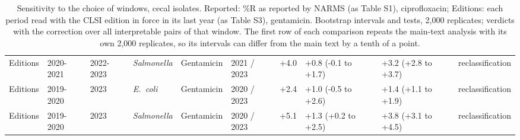 \begin{table}[h]
\begin{tabular}{llllllrlll}
Editions & 2020-2021 & 2022-2023 & \textit{Salmonella} & Gentamicin & 2021 / 2023 & +4.0 & +0.8 (-0.1 to +1.7) & +3.2 (+2.8 to +3.7) & reclassification \\
Editions & 2019-2020 & 2023 & \textit{E.~coli} & Gentamicin & 2020 / 2023 & +2.4 & +1.0 (-0.5 to +2.6) & +1.4 (+1.1 to +1.9) & reclassification \\
Editions & 2019-2020 & 2023 & \textit{Salmonella} & Gentamicin & 2020 / 2023 & +5.1 & +1.3 (+0.2 to +2.5) & +3.8 (+3.1 to +4.5) & reclassification \\
\bottomrule
\end{tabular}
\caption{Sensitivity to the choice of windows, cecal isolates. Reported: \%R as reported by NARMS (as Table S1), ciprofloxacin; Editions: each period read with the CLSI edition in force in its last year (as Table S3), gentamicin. Bootstrap intervals and tests, 2,000 replicates; verdicts with the correction over all interpretable pairs of that window. The first row of each comparison repeats the main-text analysis with its own 2,000 replicates, so its intervals can differ from the main text by a tenth of a point.}
\end{table}

